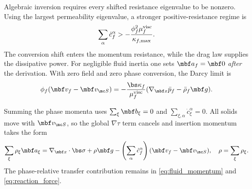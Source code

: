 \documentclass[11pt]{article}
\begin{document}
Algebraic inversion requires every shifted resistance eigenvalue to be nonzero. Using the largest permeability eigenvalue, a stronger positive-resistance regime is
\begin{equation}
 \sum_\alpha\dot c_f^\alpha>
 -\frac{\phi_f^2\mu_f^{\rm visc}}{\kappa_{f,\max}}.
 \label{eq:resistance_domain}
\end{equation}
The conversion shift enters the momentum resistance, while the drag law supplies the dissipative power. For negligible fluid inertia one sets \(\mbf a_f=\mbf0\) \emph{after} the derivation. With zero field and zero phase conversion, the Darcy limit is
\begin{equation}
 \phi_f(\mbf v_f-\mbf v_{\mc S})=
 -\frac{\bs\kappa_f}{\mu_f^{\rm visc}}
 (\nabla_{\mbf x}\bar p_f-\bar\rho_f\mbf g).
 \label{eq:darcy_limit}
\end{equation}

Summing the phase momenta uses \(\sum_\xi\mbf b_\xi=0\) and
\(\sum_{\xi,\alpha}\dot c_\xi^\alpha=0\). All solids move with \(\mbf v_{\mc S}\), so the global \(\nabla\tau\) term cancels and insertion momentum takes the form
\begin{equation}
 \sum_\xi\rho_\xi\mbf a_\xi=
 \nabla_{\mbf x}\cdot\bs\sigma+\rho\mbf g
 -\left(\sum_\alpha\dot c_f^\alpha\right)(\mbf v_f-\mbf v_{\mc S}),
 \quad \rho=\sum_\xi\rho_\xi.
 \label{eq:overall_momentum}
\end{equation}
The phase-relative transfer contribution remains in \eqref{eq:fluid_momentum} and \eqref{eq:reaction_force}.
\end{document}
